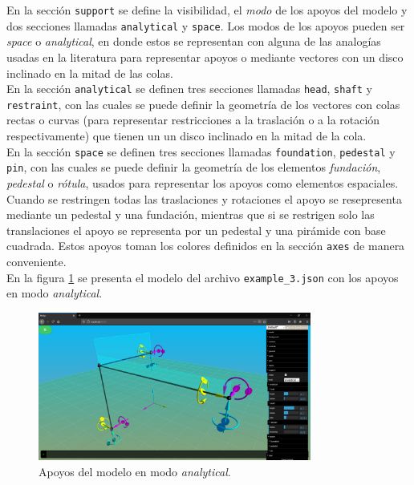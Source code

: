 En la sección \verb|support| se define la visibilidad, el \emph{modo} de los apoyos del modelo y dos secciones llamadas \verb|analytical| y \verb|space|. Los modos de los apoyos pueden ser \emph{space} o \emph{analytical}, en donde estos se representan con alguna de las analogías usadas en la literatura para representar apoyos o mediante vectores con un disco inclinado en la mitad de las colas.\\

En la sección \verb|analytical| se definen tres secciones llamadas \verb|head|, \verb|shaft| y \verb|restraint|, con las cuales se puede definir la geometría de los vectores con colas rectas o curvas (para representar restricciones a la traslación o a la rotación respectivamente) que tienen un un disco inclinado en la mitad de la cola.\\

En la sección \verb|space| se definen tres secciones llamadas \verb|foundation|, \verb|pedestal| y \verb|pin|, con las cuales se puede definir la geometría de los elementos \emph{fundación}, \emph{pedestal} o \emph{rótula}, usados para representar los apoyos como elementos espaciales. Cuando se restringen todas las traslaciones y rotaciones el apoyo se resepresenta mediante un pedestal y una fundación, mientras que si se restrigen solo las translaciones el apoyo se representa por un pedestal y una pirámide con base cuadrada. Estos apoyos toman los colores definidos en la sección \verb|axes| de manera conveniente.\\

En la figura \ref{fig:dat.gui-support} se presenta el modelo del archivo \verb|example_3.json| con los apoyos en modo \emph{analytical}.\\

\begin{figure}[ht]
  \centering
  \includegraphics[width=0.8\textwidth]{introduction/dat-gui-support.png}
  \caption{Apoyos del modelo en modo \emph{analytical}.}
  \label{fig:dat.gui-support}
\end{figure}

